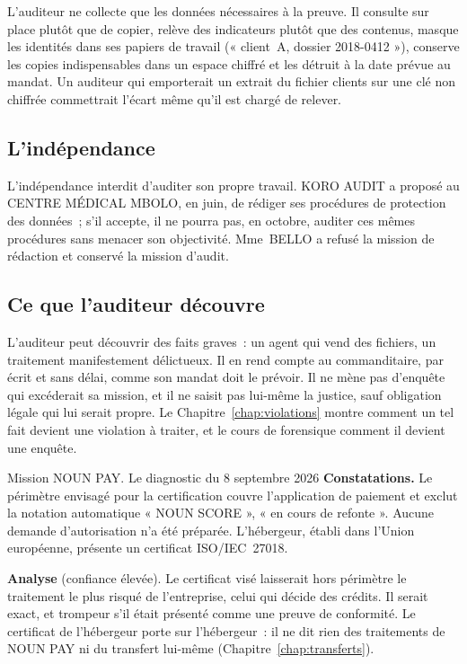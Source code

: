 L'auditeur ne collecte que les données nécessaires à la preuve. Il consulte
sur place plutôt que de copier, relève des indicateurs plutôt que des
contenus, masque les identités dans ses papiers de travail (« client~A,
dossier 2018-0412 »), conserve les copies indispensables dans un espace
chiffré et les détruit à la date prévue au mandat. Un auditeur qui
emporterait un extrait du fichier clients sur une clé non chiffrée
commettrait l'écart même qu'il est chargé de relever.

\subsection{L'indépendance}

L'indépendance interdit d'auditer son propre travail. KORO AUDIT a proposé
au CENTRE MÉDICAL MBOLO, en juin, de rédiger ses procédures de protection
des données~; s'il accepte, il ne pourra pas, en octobre, auditer ces
mêmes procédures sans menacer son objectivité. Mme~BELLO a refusé la
mission de rédaction et conservé la mission d'audit.

\subsection{Ce que l'auditeur découvre}

L'auditeur peut découvrir des faits graves~: un agent qui vend des fichiers,
un traitement manifestement délictueux. Il en rend compte au commanditaire,
par écrit et sans délai, comme son mandat doit le prévoir. Il ne mène pas
d'enquête qui excéderait sa mission, et il ne saisit pas lui-même la
justice, sauf obligation légale qui lui serait propre. Le
Chapitre~\ref{chap:violations} montre comment un tel fait devient une
violation à traiter, et le cours de forensique comment il devient une
enquête.

\begin{boxscenario}{Mission NOUN PAY. Le diagnostic du 8 septembre 2026}
\textbf{Constatations.} Le périmètre envisagé pour la certification couvre
l'application de paiement et exclut la notation automatique « NOUN SCORE »,
« en cours de refonte ». Aucune demande d'autorisation n'a été préparée.
L'hébergeur, établi dans l'Union européenne, présente un certificat
ISO/IEC~27018.

\textbf{Analyse} (confiance élevée). Le certificat visé laisserait hors
périmètre le traitement le plus risqué de l'entreprise, celui qui
décide des crédits. Il serait exact, et trompeur s'il était présenté comme
une preuve de conformité. Le certificat de l'hébergeur porte sur
l'hébergeur~: il ne dit rien des traitements de NOUN PAY ni du transfert
lui-même (Chapitre~\ref{chap:transferts}).
\end{boxscenario}

